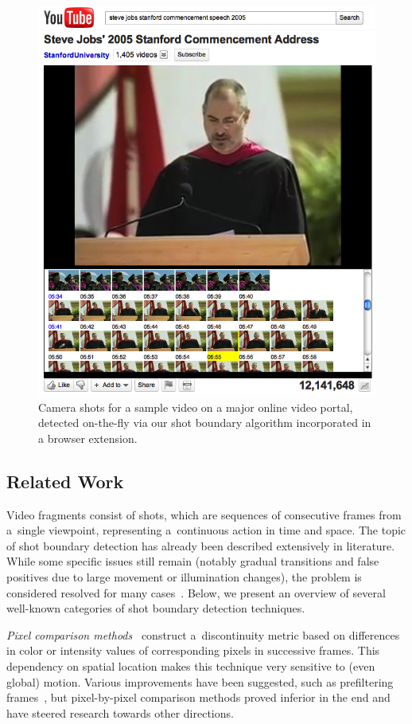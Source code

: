 \begin{figure}
  \begin{center}
    \includegraphics[width=0.7\linewidth]{./stevejobs.png}
  \end{center}
  \caption{Camera shots for a sample video on 
    a major online video portal, detected on-the-fly via
    our shot boundary algorithm incorporated
    in a browser extension.}
  \label{fig:screenshot}
\end{figure}

\subsection{Related Work} \label{sec:related-work}
Video fragments consist of shots, which are sequences of
consecutive frames from a~single viewpoint,
representing a~continuous action in time and space.
The topic of shot boundary detection has already been described
extensively in literature.
While some specific issues still remain
(notably gradual transitions and false positives
due to large movement or illumination changes),
the problem is considered resolved for many
cases~\cite{yuan2007shotboundary,hanjalic2002shotboundary}.
Below, we present an overview of several well-known categories of shot boundary detection techniques.

\emph{Pixel comparison
methods}~\cite{hampapur1994videosegmentation,
zhang1993videopartitioning} construct a~discontinuity metric
based on differences in color or intensity values
of corresponding pixels in successive frames.
This dependency on spatial location makes this technique
very sensitive to (even global) motion.
Various improvements have been suggested, such as prefiltering
frames~\cite{zhang1995videoparsing},
but pixel-by-pixel comparison methods proved inferior in the end
and have steered research towards other directions.

